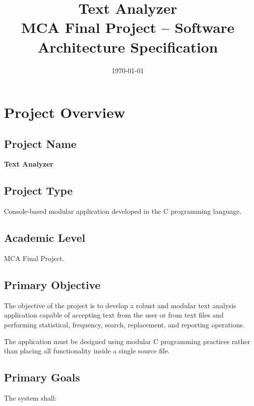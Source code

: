 \documentclass[12pt,a4paper]{article}
\title{
    \textbf{Text Analyzer}\\
    \large MCA Final Project -- Software Architecture Specification
}
\author{}
\date{\today}
\begin{document}
\maketitle

\tableofcontents
\newpage


\section{Project Overview}

\subsection{Project Name}

\textbf{Text Analyzer}

\subsection{Project Type}

Console-based modular application developed in the C programming language.

\subsection{Academic Level}

MCA Final Project.

\subsection{Primary Objective}

The objective of the project is to develop a robust and modular text
analysis application capable of accepting text from the user or from
text files and performing statistical, frequency, search, replacement,
and reporting operations.

The application must be designed using modular C programming practices
rather than placing all functionality inside a single source file.

\subsection{Primary Goals}

The system shall:
\end{document}
